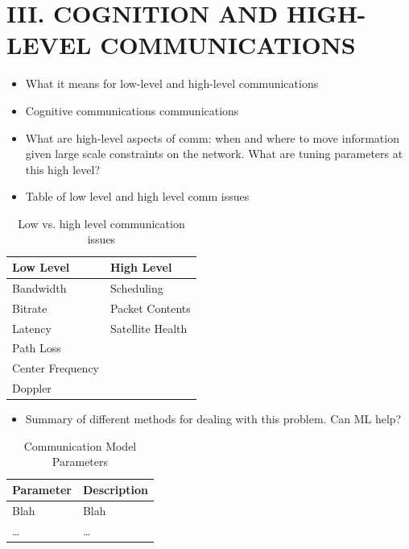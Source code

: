 \documentclass[11pt]{article}
\begin{document}
\section*{III. COGNITION AND HIGH-LEVEL COMMUNICATIONS}
\label{sec:org60024b8}

\begin{itemize}
\item What it means for low-level and high-level communications

\item Cognitive communications communications

\item What are high-level aspects of comm: when and where to move information given
large scale constraints on the network. What are tuning parameters at this
high level?

\item Table of low level and high level comm issues
\end{itemize}

\begin{table}[htbp]
\centering
\begin{tabular}{|l|l|}
\hline
\textbf{Low Level} & \textbf{High Level}\\
\hline
Bandwidth & Scheduling\\
\hline
Bitrate & Packet Contents\\
\hline
Latency & Satellite Health\\
\hline
Path Loss & \\
\hline
Center Frequency & \\
\hline
Doppler & \\
\hline
\end{tabular}
\caption{Low vs. high level communication issues}

\end{table}


\begin{itemize}
\item Summary of different methods for dealing with this problem. Can ML help?
\end{itemize}

\begin{table}[htbp]
\centering
\begin{tabular}{|l|l|}
\hline
\textbf{Parameter} & \textbf{Description}\\
\hline
Blah & Blah\\
\hline
\ldots{} & \ldots{}\\
\hline
\end{tabular}
\caption{Communication Model Parameters}

\end{table}
\end{document}
